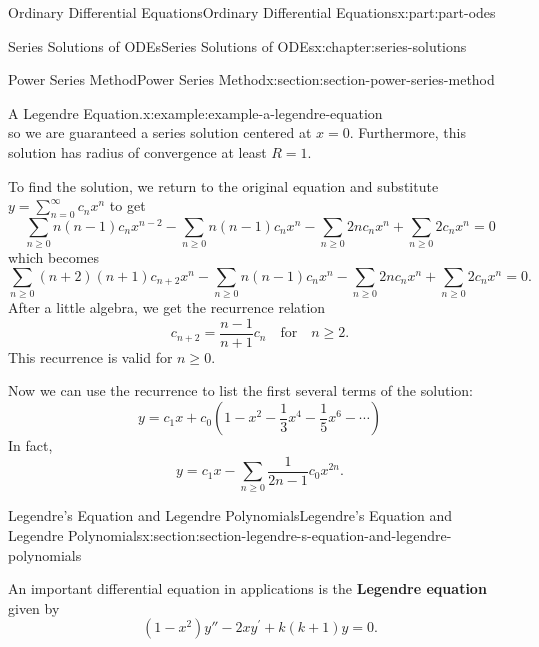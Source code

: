 \documentclass[oneside,10pt,]{book}
\newcommand{\terminology}[1]{\textbf{#1}}
\numberwithin{equation}{part}
\begin{document}
\begin{partptx}{Ordinary Differential Equations}{}{Ordinary Differential Equations}{}{}{x:part:part-odes}
\begin{chapterptx}{Series Solutions of ODEs}{}{Series Solutions of ODEs}{}{}{x:chapter:series-solutions}
\begin{sectionptx}{Power Series Method}{}{Power Series Method}{}{}{x:section:section-power-series-method}
\begin{example}{A Legendre Equation.}{x:example:example-a-legendre-equation}
\begin{equation*}
\end{equation*}
so we are guaranteed a series solution centered at \(x = 0\). Furthermore, this solution has radius of convergence at least \(R = 1\).%
\par
To find the solution, we return to the original equation and substitute \(y = \sum_{n=0}^{\infty}c_{n}x^{n}\) to get%
\begin{equation*}
\sum_{n\geq0}n(n-1)c_{n}x^{n-2} - \sum_{n\geq0}n(n-1)c_{n}x^{n} - \sum_{n\geq0}2nc_{n}x^{n} + \sum_{n\geq0}2c_{n}x^{n} = 0
\end{equation*}
which becomes%
\begin{equation*}
\sum_{n\geq0}(n + 2)(n+1)c_{n+2}x^{n} - \sum_{n\geq0}n(n-1)c_{n}x^{n} - \sum_{n\geq0}2nc_{n}x^{n} + \sum_{n\geq0}2c_{n}x^{n} = 0\text{.}
\end{equation*}
After a little algebra, we get the recurrence relation%
\begin{equation*}
c_{n+2} = \frac{n-1}{n+1}c_{n}\quad\text{for}\quad n\geq2\text{.}
\end{equation*}
This recurrence is valid for \(n\geq0\).%
\par
Now we can use the recurrence to list the first several terms of the solution:%
\begin{equation*}
y = c_{1}x + c_{0}(1 - x^{2} - \frac{1}{3}x^{4} - \frac{1}{5}x^{6} - \cdots)
\end{equation*}
In fact,%
\begin{equation*}
y = c_{1}x - \sum_{n\geq0}\frac{1}{2n - 1}c_{0}x^{2n}\text{.}
\end{equation*}
%
\end{example}
\end{sectionptx}
%
%
\typeout{************************************************}
\typeout{************************************************}
%
\begin{sectionptx}{Legendre's Equation and Legendre Polynomials}{}{Legendre's Equation and Legendre Polynomials}{}{}{x:section:section-legendre-s-equation-and-legendre-polynomials}
\begin{introduction}{}%
An important differential equation in applications is the \terminology{Legendre equation} given by%
\begin{equation}
(1 - x^{2})y'' - 2xy^\prime + k(k + 1)y = 0\text{.}\label{x:men:equation-legendre-ode}
\end{equation}

\end{introduction}
\end{sectionptx}
\end{chapterptx}
\end{partptx}
\end{document}

